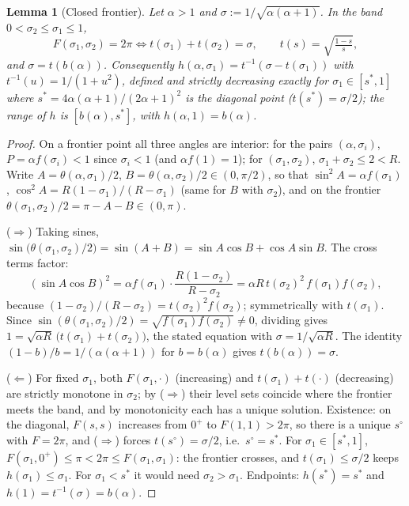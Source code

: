 \documentclass[11pt]{article}
\newtheorem{lemma}[theorem]{Lemma}
\theoremstyle{definition}
\begin{document}
\begin{lemma}[Closed frontier]\label{lem:CF}
Let $\alpha>1$ and $\sigma:=1/\sqrt{\alpha(\alpha+1)}$. In the band
$0<\sigma_2\le\sigma_1\le1$,
\[
F(\sigma_1,\sigma_2)=2\pi\iff t(\sigma_1)+t(\sigma_2)=\sigma,
\qquad t(s)=\sqrt{\tfrac{1-s}{s}},
\]
and $\sigma=t(b(\alpha))$. Consequently
$h(\alpha,\sigma_1)=t^{-1}(\sigma-t(\sigma_1))$ with $t^{-1}(u)=1/(1+u^2)$,
defined and strictly decreasing exactly for $\sigma_1\in[s^*,1]$ where
$s^*=4\alpha(\alpha+1)/(2\alpha+1)^2$ is the diagonal point
($t(s^*)=\sigma/2$); the range of $h$ is $[b(\alpha),s^*]$, with
$h(\alpha,1)=b(\alpha)$.
\end{lemma}
\begin{proof}
On a frontier point all three angles are interior: for the pairs
$(\alpha,\sigma_i)$, $P=\alpha f(\sigma_i)<1$ since $\sigma_i<1$
(and $\alpha f(1)=1$); for $(\sigma_1,\sigma_2)$,
$\sigma_1+\sigma_2\le2<R$. Write $A=\theta(\alpha,\sigma_1)/2$,
$B=\theta(\alpha,\sigma_2)/2\in(0,\pi/2)$, so that
$\sin^2\!A=\alpha f(\sigma_1)$, $\cos^2\!A=R(1-\sigma_1)/(R-\sigma_1)$
(same for $B$ with $\sigma_2$), and on the frontier
$\theta(\sigma_1,\sigma_2)/2=\pi-A-B\in(0,\pi)$.

($\Rightarrow$) Taking sines,
$\sin\bigl(\theta(\sigma_1,\sigma_2)/2\bigr)=\sin(A+B)
=\sin A\cos B+\cos A\sin B$. The cross terms factor:
\[
(\sin A\cos B)^2=\alpha f(\sigma_1)\cdot\frac{R(1-\sigma_2)}{R-\sigma_2}
=\alpha R\,t(\sigma_2)^2\,f(\sigma_1)f(\sigma_2),
\]
because $(1-\sigma_2)/(R-\sigma_2)=t(\sigma_2)^2 f(\sigma_2)$; symmetrically
with $t(\sigma_1)$. Since
$\sin(\theta(\sigma_1,\sigma_2)/2)=\sqrt{f(\sigma_1)f(\sigma_2)}\neq0$,
dividing gives $1=\sqrt{\alpha R}\,\bigl(t(\sigma_1)+t(\sigma_2)\bigr)$,
the stated equation with $\sigma=1/\sqrt{\alpha R}$. The identity
$(1-b)/b=1/(\alpha(\alpha+1))$ for $b=b(\alpha)$ gives
$t(b(\alpha))=\sigma$.

($\Leftarrow$) For fixed $\sigma_1$, both $F(\sigma_1,\cdot)$ (increasing)
and $t(\sigma_1)+t(\cdot)$ (decreasing) are strictly monotone in
$\sigma_2$; by ($\Rightarrow$) their level sets coincide where the frontier
meets the band, and by monotonicity each has a unique solution.
Existence: on the diagonal, $F(s,s)$ increases from $0^+$ to
$F(1,1)>2\pi$, so there is a unique $s^\circ$ with $F=2\pi$, and
($\Rightarrow$) forces $t(s^\circ)=\sigma/2$, i.e.\ $s^\circ=s^*$. For
$\sigma_1\in[s^*,1]$, $F(\sigma_1,0^+)\le\pi<2\pi\le F(\sigma_1,\sigma_1)$:
the frontier crosses, and $t(\sigma_1)\le\sigma/2$ keeps
$h(\sigma_1)\le\sigma_1$. For $\sigma_1<s^*$ it would need
$\sigma_2>\sigma_1$. Endpoints: $h(s^*)=s^*$ and
$h(1)=t^{-1}(\sigma)=b(\alpha)$.
\end{proof}
\end{document}
